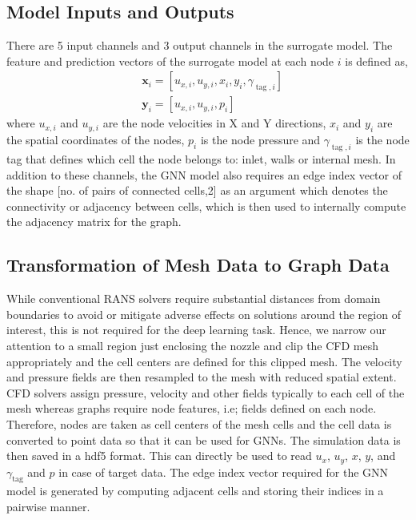 \subsection{Model Inputs and Outputs}
There are 5 input channels and 3 output channels in the surrogate model. The feature and prediction vectors of the surrogate model at each node $i$ is defined as,
\begin{equation}
    \begin{aligned}
    & \mathbf{x}_i=\left[u_{x, i}, u_{y, i},x_i, y_i, \gamma_{\operatorname{tag}, i}\right] \\
    & \mathbf{y}_i=\left[u_{x, i}, u_{y, i}, p_i\right]
    \end{aligned}
\end{equation}
where $u_{x, i}$ and $u_{y, i}$ are the node velocities in X and Y directions, $x_i$ and $y_i$ are the spatial coordinates of the nodes, $p_i$ is the node pressure and $\gamma_{\operatorname{tag}, i}$ is the node tag that defines which cell the node belongs to: inlet, walls or internal mesh. In addition to these channels, the GNN model also requires an edge index vector of the shape [no. of pairs of connected cells,2] as an argument which denotes the connectivity or adjacency between cells, which is then used to internally compute the adjacency matrix for the graph.
\subsection{Transformation of Mesh Data to Graph Data}
While conventional RANS solvers require substantial distances from domain boundaries to avoid or mitigate adverse effects on solutions around the region of interest, this is not required for the deep learning task. Hence, we narrow our attention to a small region just enclosing the nozzle and clip the CFD mesh appropriately and the cell centers are defined for this clipped mesh. The velocity and pressure fields are then resampled to the mesh with reduced spatial extent. CFD solvers assign pressure, velocity and other fields typically to each cell of the mesh whereas graphs require node features, i.e; fields defined on each node. Therefore, nodes are taken as cell centers of the mesh cells and the cell data is converted to point data so that it can be used for GNNs. The simulation data is then saved in a hdf5 format. This can directly be used to read $u_{x}$, $u_{y}$, $x$, $y$, and $\gamma_{\operatorname{tag}}$ and $p$ in case of target data. The edge index vector required for the GNN model is generated by computing adjacent cells and storing their indices in a pairwise manner.
